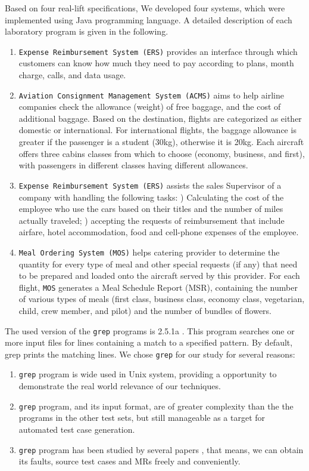 \documentclass[10pt,journal,compsoc]{IEEEtran}
\newcommand{\rmnum}[1]{\expandafter{\romannumeral #1\relax}}
\begin{document}
Based on four real-lift specifications, We developed four systems, which were implemented using Java programming language.
A detailed description of each laboratory program is given in the following.
\begin{enumerate}[1]
  \item
  \texttt{Expense Reimbursement System (ERS)} provides an interface through which customers can know how much they need to pay according to plans, month charge, calls, and data usage.
  \item
  \texttt{Aviation Consignment Management System (ACMS)} aims to help airline companies check the allowance (weight) of free baggage, and the cost of additional baggage. Based on the destination, flights are categorized as either domestic or international. For international flights, the baggage allowance is greater if the passenger is a student (30kg), otherwise it is 20kg. Each aircraft offers three cabins classes from  which to choose (economy, business, and first), with passengers in different classes having different allowances.
  \item
  \texttt{Expense Reimbursement System (ERS)} assists the sales Supervisor of a company with handling the following tasks: \rmnum{1}) Calculating the cost of the employee who use the cars based on their titles and the number of miles actually traveled; \rmnum{2}) accepting the requests of reimbursement that include airfare, hotel accommodation, food and cell-phone expenses of the employee.
  \item
  \texttt{Meal Ordering System (MOS)} helps catering provider to determine the quantity for every type of meal and other special
  requests (if any) that need to be prepared and loaded onto the aircraft served by this provider. For each flight, \texttt{MOS} generates a Meal Schedule Report (MSR), containing the number of various types of meals (first class, business class, economy class, vegetarian, child, crew member, and pilot) and the number of bundles of flowers.
\end{enumerate}

The used version of the \texttt{grep} programs is 2.5.1a \cite{grep}. This program searches one or more input files for lines containing a match to a specified pattern. By default, grep prints the matching lines. We chose \texttt{grep} for our study for several reasons:
\begin{enumerate}[1]
  \item
  \texttt{grep} program is wide used in Unix system, providing a opportunity to demonstrate the real world relevance of our techniques.
  \item
  \texttt{grep} program, and its input format, are of greater complexity than the the programs in the other test sets, but still manageable as a target for automated test case generation.
  \item
  \texttt{grep} program has been studied by several papers \cite{barus2014novel, barus2016impact, barus2016cost}, that means, we can obtain its faults, source test cases and MRs freely and conveniently.
\end{enumerate}
\end{document}
